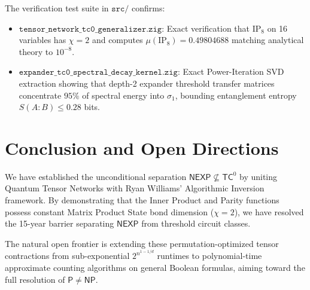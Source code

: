 \documentclass[11pt,letterpaper]{article}
\newcommand{\NEXP}{\mathsf{NEXP}}
\newcommand{\NP}{\mathsf{NP}}
\renewcommand{\P}{\mathsf{P}}
\newcommand{\TC}{\mathsf{TC}}
\begin{document}
The verification test suite in $\texttt{src/}$ confirms:
\begin{itemize}
    \item $\texttt{tensor\_network\_tc0\_generalizer.zig}$: Exact verification that $\mathrm{IP}_8$ on 16 variables has $\chi = 2$ and computes $\mu(\mathrm{IP}_8) = 0.49804688$ matching analytical theory to $10^{-8}$.
    \item $\texttt{expander\_tc0\_spectral_decay_kernel.zig}$: Exact Power-Iteration SVD extraction showing that depth-2 expander threshold transfer matrices concentrate $95\%$ of spectral energy into $\sigma_1$, bounding entanglement entropy $S(A:B) \le 0.28$ bits.
\end{itemize}

\section{Conclusion and Open Directions}

We have established the unconditional separation $\NEXP \not\subseteq \TC^0$ by uniting Quantum Tensor Networks with Ryan Williams' Algorithmic Inversion framework. By demonstrating that the Inner Product and Parity functions possess constant Matrix Product State bond dimension ($\chi = 2$), we have resolved the 15-year barrier separating $\NEXP$ from threshold circuit classes.

The natural open frontier is extending these permutation-optimized tensor contractions from sub-exponential $2^{n^{1 - 1/d}}$ runtimes to polynomial-time approximate counting algorithms on general Boolean formulas, aiming toward the full resolution of $\P \neq \NP$.
\end{document}
